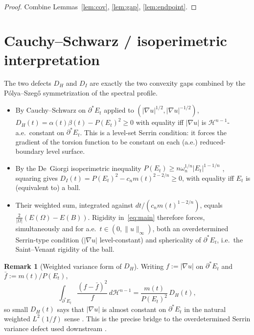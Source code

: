 \documentclass[11pt]{article}
\theoremstyle{definition}
\newtheorem{remark}[theorem]{Remark}
\newcommand{\Om}{\Omega}
\begin{document}
\begin{proof}
Combine Lemmas~\ref{lem:cov}, \ref{lem:gap}, \ref{lem:endpoint}.
\end{proof}

\section{Cauchy--Schwarz / isoperimetric interpretation}
\label{sec:CS}

The two defects $D_{H}$ and $D_{I}$ are exactly the two convexity gaps
combined by the P\'olya--Szeg\H{o} symmetrization of the spectral
profile.

\begin{itemize}
\item By Cauchy--Schwarz on $\partial^{*}E_{t}$ applied to
$(|\nabla u|^{1/2},|\nabla u|^{-1/2})$, $D_{H}(t)=\alpha(t)\beta(t)-P(E_{t})^{2}
\ge 0$ with equality iff $|\nabla u|$ is $\mathcal H^{n-1}$-a.e.\ constant
on $\partial^{*}E_{t}$. This is a level-set Serrin condition: it forces
the gradient of the torsion function to be constant on each (a.e.)
reduced-boundary level surface.

\item By the De~Giorgi isoperimetric inequality
$P(E_{t})\ge n\omega_{n}^{1/n}|E_{t}|^{1-1/n}$
\cite{DeGiorgi1958,Maggi2012}, squaring gives
$D_{I}(t)=P(E_{t})^{2}-c_{n}m(t)^{2-2/n}\ge 0$, with equality iff
$E_{t}$ is (equivalent to) a ball.

\item Their weighted sum, integrated against
$dt/(c_{n}m(t)^{1-2/n})$, equals $\frac{2}{|\Om|}(E(\Om)-E(B))$.
Rigidity in~\eqref{eq:main} therefore forces, simultaneously and for
a.e.\ $t\in(0,\|u\|_{\infty})$, both an overdetermined Serrin-type
condition ($|\nabla u|$ level-constant) and sphericality of
$\partial^{*}E_{t}$, i.e.\ the Saint--Venant rigidity of the ball.
\end{itemize}

\begin{remark}[Weighted variance form of $D_{H}$]\label{rem:variance}
Writing $f:=|\nabla u|$ on $\partial^{*}E_{t}$ and
$\bar f:=m(t)/P(E_{t})$,
\[
   \int_{\partial^{*}E_{t}}\frac{(f-\bar f)^{2}}{f}\,d\mathcal H^{n-1}
   =\frac{m(t)}{P(E_{t})^{2}}\,D_{H}(t),
\]
so small $D_{H}(t)$ says that $|\nabla u|$ is almost constant on
$\partial^{*}E_{t}$ in the natural weighted $L^{2}(1/f)$ sense
\cite{BrothersZiemer1988}. This is the precise bridge to the
overdetermined Serrin variance defect used downstream
\cite{SpaceTimeIdentity,WeightedMetricTrace}.
\end{remark}
\end{document}
